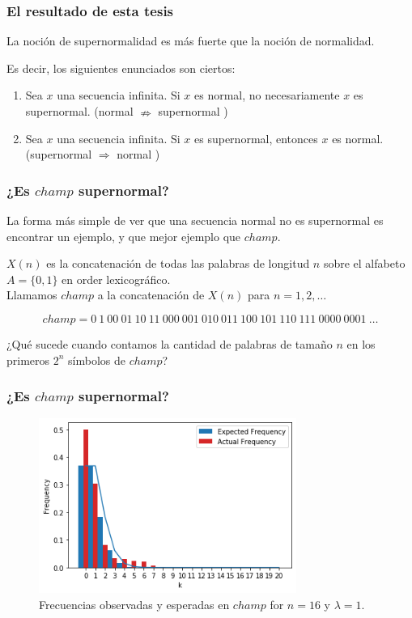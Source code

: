 \documentclass[10pt,mathserif]{beamer}%
\begin{document}
\begin{frame}
  \frametitle{El resultado de esta tesis}
  
  \begin{theorem}
    La noción de supernormalidad es más fuerte que la noción de normalidad.

    Es decir, los siguientes enunciados son ciertos:
    \begin{enumerate}
      \item Sea $x$ una secuencia infinita. Si $x$ es normal, no necesariamente  $x$ es supernormal. (normal $\nRightarrow$ supernormal )
      \item Sea $x$ una secuencia infinita. Si $x$ es supernormal, entonces $x$ es normal. (supernormal $\Rightarrow$ normal )
    \end{enumerate}
  \end{theorem}
\end{frame}

\begin{frame}
  \frametitle{¿Es $champ$ supernormal?}
  
  La forma más simple de ver que una secuencia normal no es supernormal es encontrar un ejemplo, y que mejor ejemplo que $champ$.

  \begin{recall}
    $X(n)$ es la concatenación de todas las palabras de longitud $n$ sobre el alfabeto $A=\{0,1\}$ en order lexicográfico.\\
    
    Llamamos $champ$ a la concatenación de  $X(n)$ para $n = 1,2,\dots$

    $$champ = 0 \: 1 \: 00 \: 01 \: 10 \: 11 \: 000 \: 001 \: 010 \: 011 \: 100 \: 101 \: 110 \: 111 \: 0000 \: 0001 \: \dots$$

  \end{recall}

  \pause
  ¿Qué sucede cuando contamos la cantidad de palabras de tamaño $n$ en los primeros $2^n$ símbolos de $champ$?
  
\end{frame}


\begin{frame}
  \frametitle{¿Es $champ$ supernormal?}
  \begin{figure}[h]
    \includegraphics[width=0.75\textwidth]{imagenes/champ-16-freq.png}
    \centering
    \caption{Frecuencias observadas y esperadas en $champ$ for $n = 16$ y $\lambda = 1$.}
    \label{fig:champ-22-freq}
\end{figure}
\end{frame}
\end{document}
